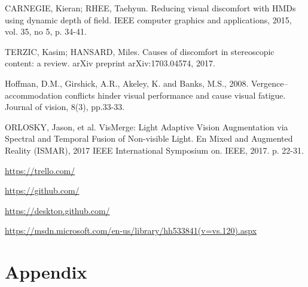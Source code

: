 \documentclass[10pt,a4paper,twocolumn,twoside]{article}
\begin{document}
\begin{thebibliography}{11}
CARNEGIE, Kieran; RHEE, Taehyun. Reducing visual discomfort with HMDs using dynamic depth of field. IEEE computer graphics and applications, 2015, vol. 35, no 5, p. 34-41.

TERZIC, Kasim; HANSARD, Miles. Causes of discomfort in stereoscopic content: a review. arXiv preprint arXiv:1703.04574, 2017.

Hoffman, D.M., Girshick, A.R., Akeley, K. and Banks, M.S., 2008. Vergence–accommodation conflicts hinder visual performance and cause visual fatigue. Journal of vision, 8(3), pp.33-33.

ORLOSKY, Jason, et al. VisMerge: Light Adaptive Vision Augmentation via Spectral and Temporal Fusion of Non-visible Light. En Mixed and Augmented Reality (ISMAR), 2017 IEEE International Symposium on. IEEE, 2017. p. 22-31.

\url{https://trello.com/}

\url{https://github.com/}

\url{https://desktop.github.com/}

\url{https://msdn.microsoft.com/en-us/library/hh533841(v=vs.120).aspx}

\end{thebibliography}

\appendix

\section*{Appendix}
\end{document}
